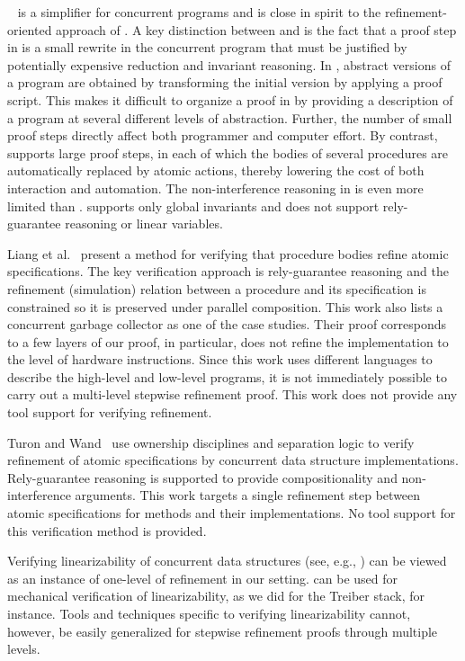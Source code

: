 \QED~\cite{ElmasQT09} is a simplifier for concurrent programs and is close in spirit to the 
refinement-oriented approach of \civl.
A key distinction between \civl and \QED is the fact that a proof step in \QED is a small rewrite in the concurrent program
that must be justified by potentially expensive reduction and invariant reasoning.
In \QED, abstract versions of a program are obtained by transforming the initial
version by applying a proof script. 
This makes it difficult to organize a proof in \QED by providing a
description of a program at several different levels of abstraction. 
Further, the number of small proof steps directly affect both programmer
and computer effort. 
By contrast, \civl supports large proof steps, in each of which the bodies of several procedures
are automatically replaced by atomic actions, thereby lowering the cost of both interaction and automation.
The non-interference reasoning in \QED is even more limited than \calvin.
\QED supports only global invariants and does not support rely-guarantee reasoning or linear variables.

Liang et al.~\cite{LiangRGSim} present a method for verifying that procedure
bodies refine atomic specifications. 
The key verification approach is
rely-guarantee reasoning and the refinement (simulation) relation between
a procedure and its specification is constrained so it is preserved under
parallel composition. 
This work also lists a concurrent garbage collector as one of the case
studies. 
Their proof corresponds to a few layers of our proof, in particular,
does not refine the implementation to the level of hardware
instructions. 
Since this work uses different languages to describe the high-level
and low-level programs, it is not immediately possible to carry out a
multi-level stepwise refinement proof. 
This work does not provide any tool support for verifying refinement. 

Turon and Wand~\cite{TuronM11} use ownership disciplines and
separation logic to verify refinement of atomic specifications by 
concurrent data structure implementations. 
Rely-guarantee reasoning is
supported to provide compositionality and non-interference
arguments. 
This work targets a single refinement step between atomic
specifications for methods and their implementations. 
No tool support for this verification method is provided. 

Verifying linearizability of concurrent data structures (see, e.g.,
\cite{tacasLin,aliLin}) can be viewed as an instance of one-level of
refinement in our setting. 
\civl can be used for mechanical
verification of linearizability, as we did for the Treiber stack, for
instance. 
Tools and techniques specific to verifying linearizability
cannot, however, be easily generalized for stepwise refinement proofs
through multiple levels. 


